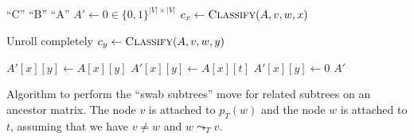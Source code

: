 \begin{algorithm}
    \begin{algorithmic}[1]
                \State \Return ``C''
                \State \Return ``B''
            \Else
                \State \Return ``A''
            \EndIf
        \EndFunction
        \State
        \State $A' \leftarrow 0 \in \{0,1\}^{|V| \times |V|}$
            \State $c_x \leftarrow \textsc{Classify}(A, v, w, x)$

             \Comment Unroll completely
                \State $c_y \leftarrow \textsc{Classify}(A, v, w, y)$

                    \State $A'[x][y] \leftarrow A[x][y]$
                    \State $A'[x][y] \leftarrow A[x][t]$
                \Else
                    \State $A'[x][y] \leftarrow 0$
                \EndIf
            \EndFor
        \EndFor
        \State \Return $A'$
        \EndFunction
    \end{algorithmic}
    \caption{Algorithm to perform the ``swab subtrees'' move for related subtrees on an ancestor matrix. The node $v$ is attached to $p_T(w)$ and the node $w$ is attached to $t$, assuming that we have $v \neq w$ and $w \leadsto_T v$.}
    \label{alg:am_swap_related}
\end{algorithm}


